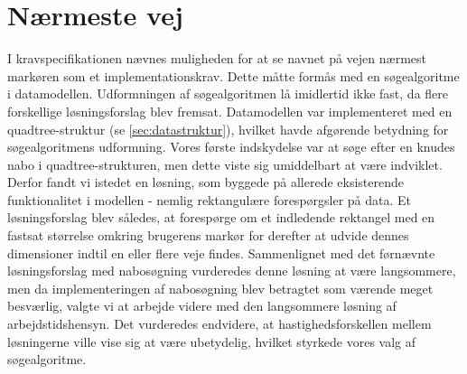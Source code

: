 \section{Nærmeste vej}
I kravspecifikationen nævnes muligheden for at se navnet på vejen nærmest markøren som et implementationskrav. Dette måtte formås med en søgealgoritme i datamodellen. Udformningen af søgealgoritmen lå imidlertid ikke fast, da flere forskellige løsningsforslag blev fremsat. Datamodellen var implementeret med en quadtree-struktur (se \ref{sec:datastruktur}), hvilket havde afgørende betydning for søgealgoritmens udformning. Vores første indskydelse var at søge efter en knudes nabo i quadtree-strukturen, men dette viste sig umiddelbart at være indviklet. Derfor fandt vi istedet en løsning, som byggede på allerede eksisterende funktionalitet i modellen - nemlig rektangulære forespørgsler på data. Et løsningsforslag blev således, at forespørge om et indledende rektangel med en fastsat størrelse omkring brugerens markør for derefter at udvide dennes dimensioner indtil en eller flere veje findes. Sammenlignet med det førnævnte løsningsforslag med nabosøgning vurderedes denne løsning at være langsommere, men da implementeringen af nabosøgning blev betragtet som værende meget besværlig, valgte vi at arbejde videre med den langsommere løsning af arbejdstidshensyn. Det vurderedes endvidere, at hastighedsforskellen mellem løsningerne ville vise sig at være ubetydelig, hvilket styrkede vores valg af søgealgoritme.